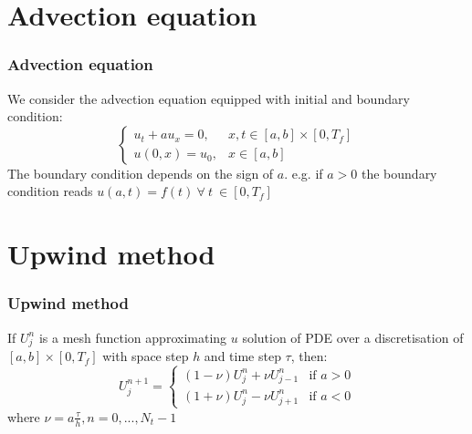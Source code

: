 \documentclass{beamer}
\begin{document}
\section{Advection equation}
\begin{frame}
\frametitle{Advection equation}
We consider the advection equation equipped with initial and boundary condition:
$$
\begin{cases}
u_t + a u_x = 0, & x,t \in [a,b] \times [0,T_f] \\
u(0,x) = u_0, & x \in [a,b]
\end{cases}
$$
The boundary condition depends on the sign of $a$. e.g. if $a > 0$ the boundary condition reads $u(a,t) = f(t) \ \forall \ t \ \in [0,T_f]$
\end{frame}
\section{Upwind method}
\begin{frame}
\frametitle{Upwind method}
If $U_j^n$ is a mesh function approximating $u$ solution of PDE over a discretisation of $[a,b] \times [0,T_f]$ with space step $h$ and time step $\tau$, then:
$$
U_j^{n+1} =
\begin{cases}
(1 - \nu) U_j^n + \nu U_{j - 1}^n & \text{if } a > 0 \\
(1 + \nu) U_j^n - \nu U_{j + 1}^n & \text{if } a < 0
\end{cases}
$$
where $\nu = a \frac{\tau}{h}, n = 0, ..., N_t - 1$
\end{frame}
\begin{frame}
\end{frame}
\end{document}

